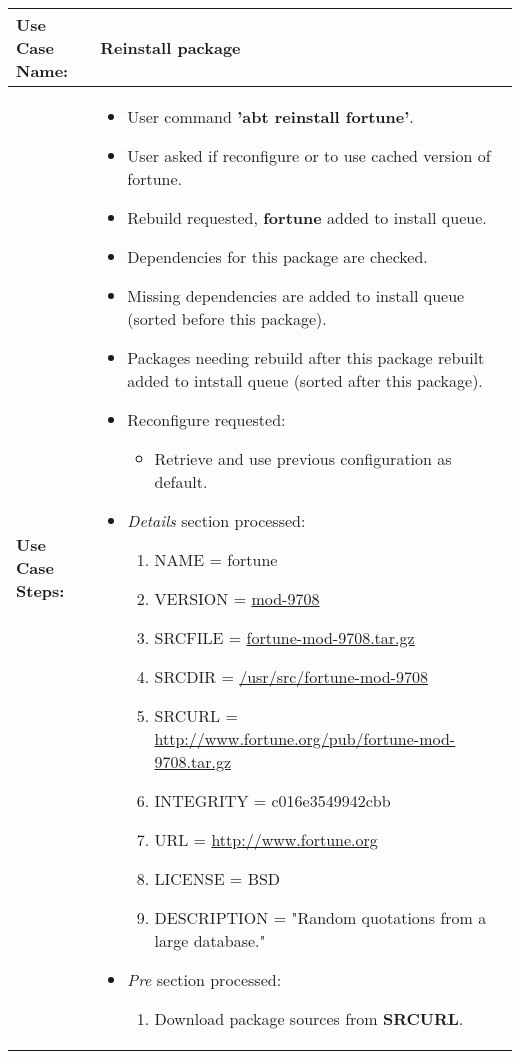 \medskip

\begin{tabularx}{\linewidth}{|l|X|}
\hline
\textbf{Use Case Name:} & \textbf{Reinstall package} \\
\hline
\textbf{Use Case Steps:} & 
\begin{minipage}{\linewidth} 
  \vspace{0.05em}
  \begin{itemize}
    \item User command \textbf{'abt reinstall fortune'}.
    \item User asked if reconfigure or to use cached version of fortune.
    \item Rebuild requested, \textbf{fortune} added to install queue.
    \item Dependencies for this package are checked.
    \item Missing dependencies are added to install queue (sorted before this package).
    \item Packages needing rebuild after this package rebuilt added to intstall queue (sorted after this package).
    \item Reconfigure requested:
    \begin{itemize}
      \item Retrieve and use previous configuration as default.
    \end{itemize}
    \item \emph{Details} section processed:
    \begin{enumerate}
      \item NAME = fortune
      \item VERSION = \url{mod-9708}
      \item SRCFILE = \url{fortune-mod-9708.tar.gz}
      \item SRCDIR = \url{/usr/src/fortune-mod-9708}
      \item SRCURL = \url{http://www.fortune.org/pub/fortune-mod-9708.tar.gz}
      \item INTEGRITY = c016e3549942cbb
      \item URL = \url{http://www.fortune.org}
      \item LICENSE = BSD
      \item DESCRIPTION = "Random quotations from a large database."
    \end{enumerate}
    \item \emph{Pre} section processed:
    \begin{enumerate}
      \item Download package sources from \textbf{SRCURL}.

\end{enumerate}
\end{itemize}
\end{minipage}
\end{tabularx}
